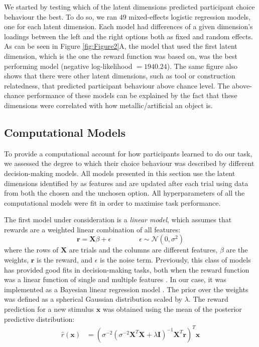 \documentclass[10pt]{article}
\begin{document}
We started by testing which of the latent dimensions predicted participant choice behaviour the best. To do so, we ran $49$ mixed-effects logistic regression models, one for each latent dimension. Each model had differences of a given dimension's loadings between the left and the right options both as fixed and random effects. As can be seen in Figure \ref{fig:Figure2}A, the model that used the first latent dimension, which is the one the reward function was based on, was the best performing model (negative log-likelihood $= 1940.24$). The same figure also shows that there were other latent dimensions, such as tool or construction relatedness, that predicted participant behaviour above chance level. The above-chance performance of these models can be explained by the fact that these dimensions were correlated with how metallic/artificial an object is. 

\subsection{Computational Models}


To provide a computational account for how participants learned to do our task, we assessed the degree to which their choice behaviour was described by different decision-making models. All models presented in this section use the latent dimensions identified by \citet{hebart_revealing_2020} as features and are updated after each trial using data from both the chosen and the unchosen option. All hyperparameters of all the computational models were fit in order to maximise task performance.

The first model under consideration is a \emph{linear model}, which assumes that rewards are a weighted linear combination of all features: 
\begin{equation*}
\textbf{r} = \textbf{X}\beta + \epsilon \qquad\qquad \epsilon \sim \mathcal{N}(0, \sigma^2)    
\end{equation*}
where the rows of $\textbf{X}$ are trials and the columns are different features, $\beta$ are the weights, $\textbf{r}$ is the reward, and $\epsilon$ is the noise term. Previously, this class of models has provided good fits in decision-making tasks, both when the reward function was a linear function of single \citep{niv_reinforcement_2015} and multiple features \citep{speekenbrink_learning_2010,stojic_human_2015}. In our case, it was implemented as a Bayesian linear regression model \citep{bishop2006}. The prior over the weights was defined as a spherical Gaussian distribution scaled by $\lambda$. The reward prediction for a new stimulus $\mathbf{x}$ was obtained using the mean of the posterior predictive distribution: 
\begin{align*}
\hat{r}(\mathbf{x}) &= \left(\sigma^{-2}\left(\sigma^{-2}\textbf{X}^{T}\textbf{X} + \lambda\mathbf{I}\right)^{-1}\textbf{X}^T\textbf{r}\right)^T \mathbf{x}\end{align*}
\end{document}
